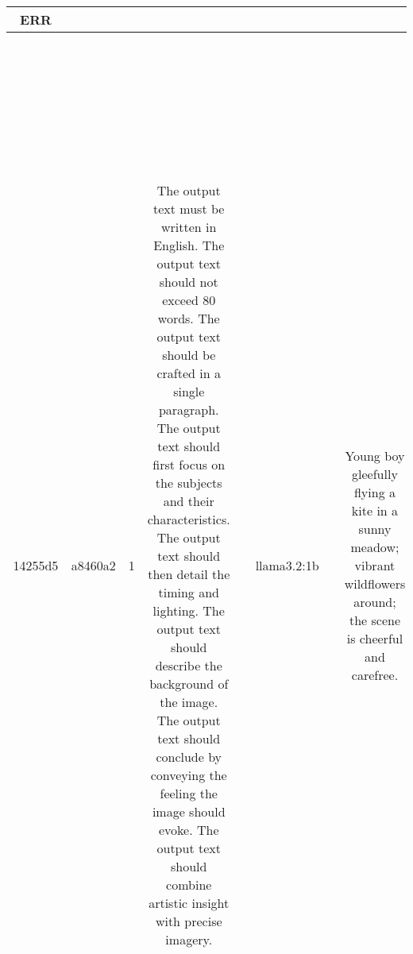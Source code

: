 \begin{table}[h!]
\begin{tabular}{|c|c|c|c|c|c|c|c|c|c|c|}
ERR\\
\hline
14255d5 & a8460a2 & 1 & The output text must be written in English. The output text should not exceed 80 words. The output text should be crafted in a single paragraph. The output text should first focus on the subjects and their characteristics. The output text should then detail the timing and lighting. The output text should describe the background of the image. The output text should conclude by conveying the feeling the image should evoke. The output text should combine artistic insight with precise imagery. &  & llama3.2:1b &  & Young boy gleefully flying a kite in a sunny meadow; vibrant wildflowers around; the scene is cheerful and carefree. & "A bright-eyed 10-year-old boy, dressed in a pastel blue shirt and jeans, stands triumphantly at the edge of a lush sun-drenched meadow, proudly grasping an adorned kite with delicate pink ribbons flapping in the gentle breeze. Vibrant, electric blue wildflowers sway around him, their petals shimmering like stardust amidst the sky's brilliant cerulean hue. Soft filter: Daylight with a subtle gradient; atmospheric perspective emphasizing texture and depth – capturing the unbridled joy of childhood freedom." & ok & The output starts by focusing on the subject, a "bright-eyed 10-year-old boy" who is characterized by his clothing and stance. It then describes the timing and lighting with "a lush sun-drenched meadow" and a "daylight with a subtle gradient." The background is elaborately depicted with "electric blue wildflowers" and "the sky's brilliant cerulean hue." The passage concludes by conveying the feeling the image should evoke, "capturing the unbridled joy of childhood freedom." Additionally, the output is crafted in a single paragraph and stays within the 80-word limit. Based on these observations, the output complies with the chatbot description.

OK\\
\hline
d26b192 & a8460a2 & 2 & The output text must not be written in English. &  & llama3.2:1b &  & A peaceful Zen garden at dusk with a tranquil pond and gently rustling trees. & Imagine strolling through a serene Zen garden, surrounded by towering trees that stand sentinel at dusk, their leaves rustled softly in the gentle evening breeze. The tranquil pond reflects the fading light, its calm surface mirroring the sky above. As the sun dips lower, warm golden tones illuminate the scene, casting long shadows across the lush greenery. The air is filled with an sense of serenity, as nature's peacefulness washes over you, calming the mind and soothing the soul. & ok & The output seems to comply with the description provided. It is crafted as a single paragraph and does not exceed 80 words. The content progresses from describing the setting and its characteristics - a Zen garden with towering trees at dusk, a tranquil pond - to the details of timing and lighting, such as the warm golden tones and long shadows. It then describes the background, including the lush greenery and the serene environment. Finally, it conveys a peaceful feeling that the image should evoke, suggesting tranquility and calmness. No violations of the given rules can be determined from the output alone.


\end{tabular}
\end{table}
